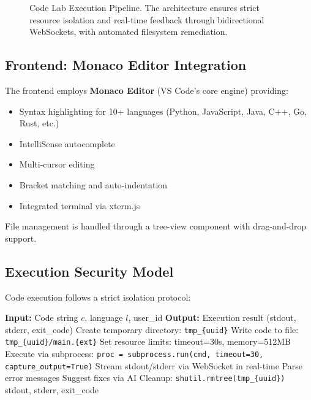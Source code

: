 \documentclass[conference]{IEEEtran}
\begin{document}
\begin{figure}[htbp]
{%
}
\caption{Code Lab Execution Pipeline. The architecture ensures strict resource isolation and real-time feedback through bidirectional WebSockets, with automated filesystem remediation.}
\label{fig:sandbox}
\end{figure}

\subsection{Frontend: Monaco Editor Integration}

The frontend employs \textbf{Monaco Editor} (VS Code's core engine) providing:
\begin{itemize}
    \item Syntax highlighting for 10+ languages (Python, JavaScript, Java, C++, Go, Rust, etc.)
    \item IntelliSense autocomplete
    \item Multi-cursor editing
    \item Bracket matching and auto-indentation
    \item Integrated terminal via xterm.js
\end{itemize}

File management is handled through a tree-view component with drag-and-drop support.

\subsection{Execution Security Model}

Code execution follows a strict isolation protocol:

\begin{algorithm}[htbp]
\caption{Secure Code Execution}
\label{alg:sandbox}
\begin{algorithmic}[1]
\STATE \textbf{Input:} Code string $c$, language $l$, user\_id
\STATE \textbf{Output:} Execution result (stdout, stderr, exit\_code)
\STATE
\STATE Create temporary directory: \texttt{tmp\_\{uuid\}}
\STATE Write code to file: \texttt{tmp\_\{uuid\}/main.\{ext\}}
\STATE
\STATE Set resource limits: timeout=30s, memory=512MB
\STATE Execute via subprocess:
\STATE \quad \texttt{proc = subprocess.run(cmd, timeout=30, capture\_output=True)}
\STATE
\STATE Stream stdout/stderr via WebSocket in real-time
\STATE
{}
    \STATE Parse error messages
    \STATE Suggest fixes via AI
\ENDIF
\STATE
\STATE Cleanup: \texttt{shutil.rmtree(tmp\_\{uuid\})}
\RETURN stdout, stderr, exit\_code
\end{algorithmic}
\end{algorithm}
\end{document}
